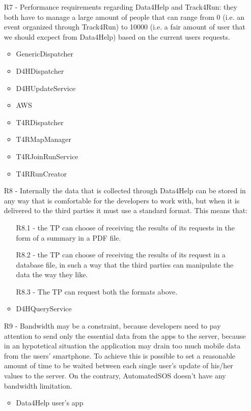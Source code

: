\begin{itemize}
\item [R7] - Performance requirements regarding Data4Help and Track4Run: they both have to manage a large amount of people that can range from 0 (i.e. an event organized through Track4Run) to 10000 (i.e. a fair amount of user that we should excpect from Data4Help) based on the current users requests.
\begin{itemize}
	\item GenericDispatcher
	\item D4HDispatcher
	\item D4HUpdateService
	\item AWS
	\item T4RDispatcher
	\item T4RMapManager
	\item T4RJoinRunService
	\item T4RRunCreator
\end{itemize}


\item [R8] - Internally the data that is collected through Data4Help can be stored in any way that is comfortable for the developers to work with, but when it is delivered to the third parties it must use a standard format.
This means that:
\begin{enumerate}
\item [R8.1] - the TP can choose of receiving the results of its requests in the form of a summary in a PDF file. 
\item [R8.2] - the TP can choose of receiving the results of its request in a database file, in such a way that the third parties can manipulate the data the way they like.
\item [R8.3] - The TP can request both the formats above.  
\end{enumerate}
\begin{itemize}
	\item D4HQueryService
\end{itemize}


\item [R9] - Bandwidth may be a constraint, because developers need to pay attention to send only the essential data from the apps to the server, because in an hypotetical situation the application may drain too much mobile data from the users’ smartphone. To achieve this is possible to set a reasonable amount of time to be waited between each single user’s update of his/her values to the server. On the contrary, AutomatedSOS doesn’t have any bandwidth limitation.
\begin{itemize}
	\item Data4Help user's app
\end{itemize}


\end{itemize}
